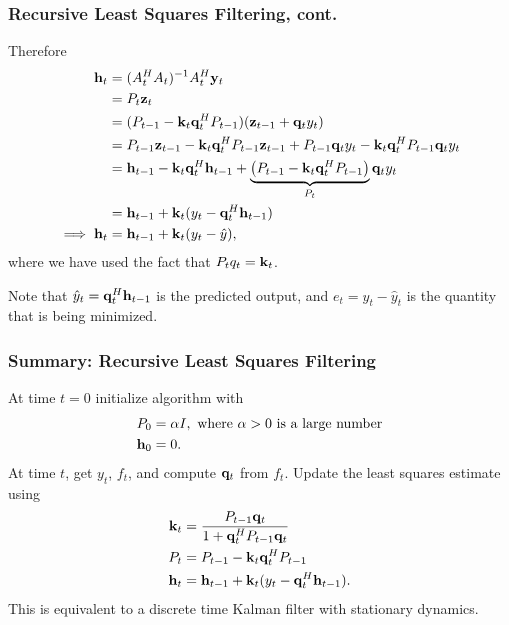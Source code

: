 \documentclass{beamer}
\begin{document}
\begin{frame}\frametitle{Recursive Least Squares Filtering, cont.}
	Therefore
	\begin{align*}
		\mathbf{h}_t	&= (A_t^H A_t)^{-1} A_t^H \mathbf{y}_t \\
				&= P_t \mathbf{z}_t \\
				&= (P_{t-1} - \mathbf{k}_t \mathbf{q}_t^H P_{t-1})(\mathbf{z}_{t-1} + \mathbf{q}_t y_t)\\
				&= P_{t-1} \mathbf{z}_{t-1} - \mathbf{k}_t \mathbf{q}_t^H P_{t-1} \mathbf{z}_{t-1} + P_{t-1} \mathbf{q}_t y_t - \mathbf{k}_t \mathbf{q}_t^H P_{t-1} \mathbf{q}_t y_t\\
				&= \mathbf{h}_{t-1} - \mathbf{k}_t \mathbf{q}_t^H \mathbf{h}_{t-1} + \underbrace{\left( P_{t-1}-\mathbf{k}_t \mathbf{q}_t^H P_{t-1} \right)}_{P_t} \mathbf{q}_t y_t \\
				&= \mathbf{h}_{t-1} + \mathbf{k}_t(y_t - \mathbf{q}_t^H \mathbf{h}_{t-1}) \\
		\implies \mathbf{h}_t &= \mathbf{h}_{t-1} + \mathbf{k}_t(y_t - \hat{y}),
	\end{align*}
	where we have used the fact that $P_t q_t = \mathbf{k}_t$.

	Note that $\hat{y}_t = \mathbf{q}_t^H \mathbf{h}_{t-1}$ is the predicted output, and $e_t=y_t-\hat{y}_t$ is the quantity that is being minimized.
\end{frame}

\begin{frame}\frametitle{Summary: Recursive Least Squares Filtering}
	At time $t=0$ initialize algorithm with
	\begin{align*}
		P_0 &= \alpha I, \text{~where $\alpha>0$ is a large number} \\
		\mathbf{h}_0 &= 0.
	\end{align*}
	At time $t$, get $y_t$, $f_t$, and compute $\mathbf{q}_t$ from $f_t$.  Update the least squares estimate using  
	\begin{align*}
  		\mathbf{k}_t &= \frac{P_{t-1} \mathbf{q}_t}{1 + \mathbf{q}_t^H P_{t-1} \mathbf{q}_t} \\
  		P_t &= P_{t-1} - \mathbf{k}_t \mathbf{q}_t^H P_{t-1} \\
  		\mathbf{h}_t &= \mathbf{h}_{t - 1} + \mathbf{k}_t (y_t - \mathbf{q}_t^H \mathbf{h}_{t-1}).
	\end{align*}
This is equivalent to a discrete time Kalman filter with stationary dynamics.
	
\end{frame}
\end{document}
